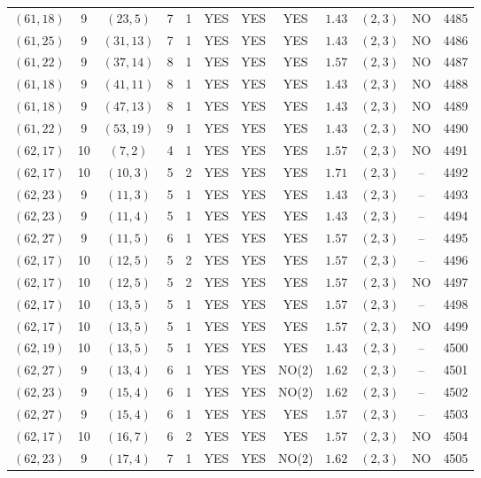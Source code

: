 \begin{longtable}{|c|c|c|c|c|c|c|c|c|c|c|c|}
$(61,18)$ & 9 & $(23,5)$ & 7 & 1 & YES & YES & YES & $1.43$ & $(2,3)$ & NO & 4485\\
$(61,25)$ & 9 & $(31,13)$ & 7 & 1 & YES & YES & YES & $1.43$ & $(2,3)$ & NO & 4486\\
$(61,22)$ & 9 & $(37,14)$ & 8 & 1 & YES & YES & YES & $1.57$ & $(2,3)$ & NO & 4487\\
$(61,18)$ & 9 & $(41,11)$ & 8 & 1 & YES & YES & YES & $1.43$ & $(2,3)$ & NO & 4488\\
$(61,18)$ & 9 & $(47,13)$ & 8 & 1 & YES & YES & YES & $1.43$ & $(2,3)$ & NO & 4489\\
$(61,22)$ & 9 & $(53,19)$ & 9 & 1 & YES & YES & YES & $1.43$ & $(2,3)$ & NO & 4490\\
$(62,17)$ & 10 & $(7,2)$ & 4 & 1 & YES & YES & YES & $1.57$ & $(2,3)$ & NO & 4491\\
$(62,17)$ & 10 & $(10,3)$ & 5 & 2 & YES & YES & YES & $1.71$ & $(2,3)$ & -- & 4492\\
$(62,23)$ & 9 & $(11,3)$ & 5 & 1 & YES & YES & YES & $1.43$ & $(2,3)$ & -- & 4493\\
$(62,23)$ & 9 & $(11,4)$ & 5 & 1 & YES & YES & YES & $1.43$ & $(2,3)$ & -- & 4494\\
$(62,27)$ & 9 & $(11,5)$ & 6 & 1 & YES & YES & YES & $1.57$ & $(2,3)$ & -- & 4495\\
$(62,17)$ & 10 & $(12,5)$ & 5 & 2 & YES & YES & YES & $1.57$ & $(2,3)$ & -- & 4496\\
$(62,17)$ & 10 & $(12,5)$ & 5 & 2 & YES & YES & YES & $1.57$ & $(2,3)$ & NO & 4497\\
$(62,17)$ & 10 & $(13,5)$ & 5 & 1 & YES & YES & YES & $1.57$ & $(2,3)$ & -- & 4498\\
$(62,17)$ & 10 & $(13,5)$ & 5 & 1 & YES & YES & YES & $1.57$ & $(2,3)$ & NO & 4499\\
$(62,19)$ & 10 & $(13,5)$ & 5 & 1 & YES & YES & YES & $1.43$ & $(2,3)$ & -- & 4500\\
$(62,27)$ & 9 & $(13,4)$ & 6 & 1 & YES & YES & NO(2) & $1.62$ & $(2,3)$ & -- & 4501\\
$(62,23)$ & 9 & $(15,4)$ & 6 & 1 & YES & YES & NO(2) & $1.62$ & $(2,3)$ & -- & 4502\\
$(62,27)$ & 9 & $(15,4)$ & 6 & 1 & YES & YES & YES & $1.57$ & $(2,3)$ & -- & 4503\\
$(62,17)$ & 10 & $(16,7)$ & 6 & 2 & YES & YES & YES & $1.57$ & $(2,3)$ & NO & 4504\\
$(62,23)$ & 9 & $(17,4)$ & 7 & 1 & YES & YES & NO(2) & $1.62$ & $(2,3)$ & NO & 4505\\

\end{longtable}
